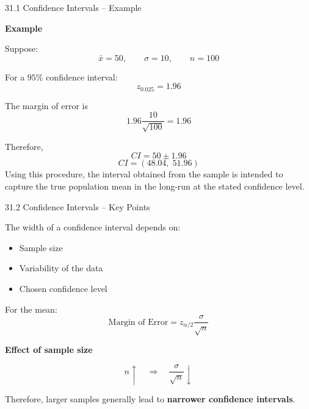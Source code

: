 
\begin{frame}{31.1 Confidence Intervals -- Example}

\textbf{Example}

Suppose:
\[
\bar{x}=50,\qquad
\sigma=10,\qquad
n=100
\]

For a $95\%$ confidence interval:
\[
z_{0.025}=1.96
\]

The margin of error is
\[
1.96\frac{10}{\sqrt{100}}
=
1.96
\]

Therefore,
\[
CI
=
50\pm1.96
\]
\[
\boxed{
CI=(48.04,\;51.96)
}
\]
Using this procedure, the interval obtained from the sample is intended to capture the true population mean in the long-run at the stated confidence level.

\end{frame}



\begin{frame}{31.2 Confidence Intervals -- Key Points}

The width of a confidence interval depends on:

\begin{itemize}
    \item Sample size
    \item Variability of the data
    \item Chosen confidence level
\end{itemize}

For the mean:
\[
\boxed{
\text{Margin of Error}
=
z_{\alpha/2}
\frac{\sigma}{\sqrt n}
}
\]

\textbf{Effect of sample size}

\[
n\uparrow
\quad\Rightarrow\quad
\frac{\sigma}{\sqrt n}\downarrow
\]

Therefore, larger samples generally lead to
\textbf{narrower confidence intervals}.

\end{frame}